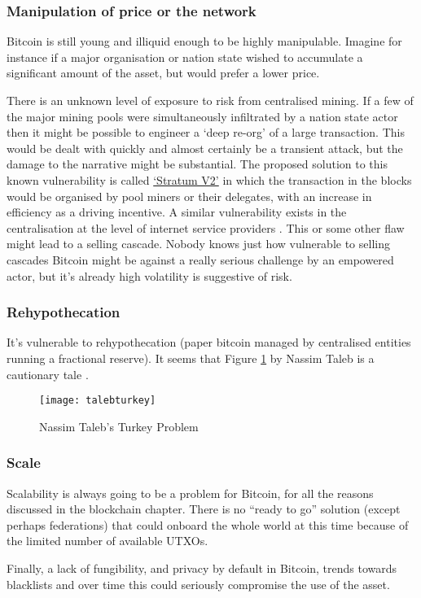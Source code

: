 \subsubsection{Manipulation of price or the network}
Bitcoin is still young and illiquid enough to be highly manipulable. Imagine for instance if a major organisation or nation state wished to accumulate a significant amount of the asset, but would prefer a lower price. \par%
There is an unknown level of exposure to risk from centralised mining. If a few of the major mining pools were simultaneously infiltrated by a nation state actor then it might be possible to engineer a `deep re-org' of a large transaction. This would be dealt with quickly and almost certainly be a transient attack, but the damage to the narrative might be substantial. The proposed solution to this known vulnerability is called \href{https://braiins.com/stratum-v2}{`Stratum V2'} in which the transaction in the blocks would be organised by pool miners or their delegates, with an increase in efficiency as a driving incentive. A similar vulnerability exists in the centralisation at the level of internet service providers \cite{apostolaki2017hijacking}. This or some other flaw might lead to a selling cascade. Nobody knows just how vulnerable to selling cascades Bitcoin might be against a really serious challenge by an empowered actor, but it's already high volatility is suggestive of risk. 
\subsubsection{Rehypothecation}
It's vulnerable to rehypothecation (paper bitcoin managed by centralised entities running a fractional reserve). It seems that Figure \ref{fig:talebturkey} by  Nassim Taleb is a cautionary tale \cite{taleb2012antifragile}.
\begin{figure}
  \centering
    \texttt{[image: talebturkey]}
  \caption{Nassim Taleb's Turkey Problem}
  \label{fig:talebturkey}
\end{figure}
\subsubsection{Scale}
Scalability is always going to be a problem for Bitcoin, for all the reasons discussed in the blockchain chapter. There is no ``ready to go'' solution (except perhaps federations) that could onboard the whole world at this time because of the limited number of available UTXOs.\par 
Finally, a lack of fungibility, and privacy by default in Bitcoin, trends towards blacklists and over time this could seriously compromise the use of the asset. 
